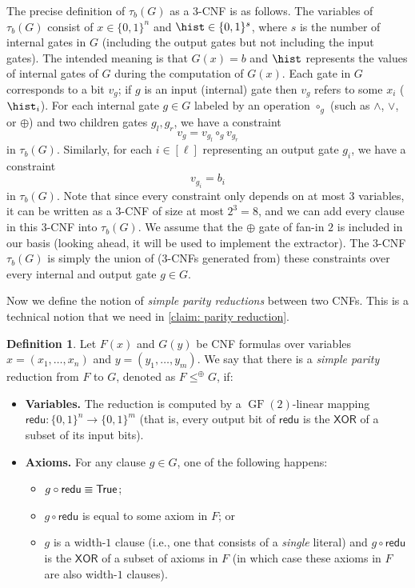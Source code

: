 \documentclass[10pt,a4paper]{article}
\theoremstyle{definition}
\newtheorem{definition}[theorem]{Definition}
\theoremstyle{remark}
\DeclareMathOperator{\GF}{GF}
\newcommand{\XOR}{\mathsf{XOR}}
\newenvironment{compactitem}{\begin{itemize}}{\end{itemize}}
\begin{document}
The precise definition of $\tau_b(G)$ as a $3$-CNF is as follows. The variables of $\tau_b(G)$ consist of $x\in \{0, 1\}^n$ and $\hist \in \{0, 1\}^s$, where $s$ is the number of internal gates in $G$ (including the output gates but not including the input gates). The intended meaning is that $G(x) = b$ and $\hist$ represents the values of internal gates of $G$ during the computation of $G(x)$. Each gate in $G$ corresponds to a bit $v_g$; if $g$ is an input (internal) gate then $v_g$ refers to some $x_i$ ($\hist_i$). For each internal gate $g \in G$ labeled by an operation $\circ_g$ (such as $\land$, $\lor$, or $\oplus$) and two children gates $g_l, g_r$, we have a constraint
\[v_g = v_{g_l} \mathbin{\circ_g} v_{g_r}\]
in $\tau_b(G)$. Similarly, for each $i\in [\ell]$ representing an output gate $g_i$, we have a constraint
\[v_{g_i} = b_i\]
in $\tau_b(G)$. Note that since every constraint only depends on at most $3$ variables, it can be written as a $3$-CNF of size at most $2^3 = 8$, and we can add every clause in this $3$-CNF into $\tau_b(G)$. We assume that the $\oplus$ gate of fan-in $2$ is included in our basis (looking ahead, it will be used to implement the extractor). The $3$-CNF $\tau_b(G)$ is simply the union of ($3$-CNFs generated from) these constraints over every internal and output gate $g \in G$.

Now we define the notion of \emph{simple parity reductions} between two CNFs. This is a technical notion that we need in \autoref{claim: parity reduction}.

\def\redu{\mathsf{redu}}

\begin{definition}\label{def: parity reduction}
    Let $F(x)$ and $G(y)$ be CNF formulas over variables $x = (x_1, \dots, x_n)$ and $y = (y_1, \dots, y_m)$. We say that there is a \emph{simple parity} reduction from $F$ to $G$, denoted as $F\le^\oplus G$, if:
    \begin{itemize}
        \item {\bf Variables.} The reduction is computed by a $\GF(2)$-linear mapping $\redu: \{0, 1\}^n \to \{0, 1\}^m$ (that is, every output bit of $\redu$ is the $\XOR$ of a subset of its input bits).
        \item {\bf Axioms.} For any clause $g\in G$, one of the following happens:\begin{compactitem}
            \item $g\circ\redu\equiv {\sf True}$;
            \item $g\circ\redu$ is equal to some axiom in $F$; or
            \item $g$ is a width-$1$ clause (i.e., one that consists of a \emph{single} literal) and $g\circ\redu$ is the $\XOR$ of a subset of axioms in $F$ (in which case these axioms in $F$ are also width-$1$ clauses).
        \end{compactitem}
        
        
    \end{itemize}
\end{definition}
\end{document}
